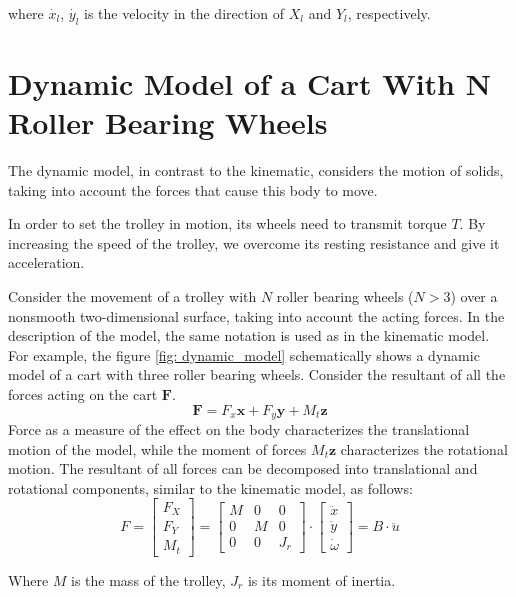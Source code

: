 \documentclass[oneside,final,14pt]{extreport}
\newcommand{\bs}{\boldsymbol}
\begin{document}
where $ \dot{x_{l}} $, $ \dot{y_{l}} $ is the velocity in the direction of $ X_{l} $ and $ Y_{l} $, respectively.
\fi

\chapter{Dynamic Model of a Cart With N Roller Bearing  Wheels}
The dynamic model, in contrast to the kinematic, considers the motion of solids, taking into account the forces that cause this body to move.
 
In order to set the trolley in motion, its wheels need to transmit torque $ T $. By increasing the speed of the trolley, we overcome its resting resistance and give it acceleration.
 
Consider the movement of a trolley with $ N $ roller bearing  wheels ($ N> 3 $) over a nonsmooth two-dimensional surface, taking into account the acting forces. In the description of the model, the same notation is used as in the kinematic model. For example, the figure \ref{fig: dynamic_model} schematically shows a dynamic model of a cart with three roller bearing  wheels. Consider the resultant of all the forces acting on the cart $ \bs{F} $.
\begin{equation}
\bs{F}
=
F_{x} \bs{x}
+
F_{y} \bs{y}
+
M_{t} \bs{z}
\end{equation}
Force as a measure of the effect on the body characterizes the translational motion of the model, while the moment of forces $ M_{t} \bs{z} $ characterizes the rotational motion. The resultant of all forces can be decomposed into translational and rotational components, similar to the kinematic model, as follows:
\begin{equation}
F
=
\begin{bmatrix}
F_{X} \\
F_{Y} \\
M_{t}
\end{bmatrix}
=
\begin{bmatrix}
M & 0 & 0 \\
0 & M & 0 \\
0 & 0 & J_{r}
\end{bmatrix}
\cdot
\begin{bmatrix}
\ddot{x} \\
\ddot{y} \\
\dot{\omega}
\end{bmatrix}
=
B \cdot \ddot{u}
\end{equation}

Where $ M $ is the mass of the trolley, $ J_{r} $ is its moment of inertia.
\end{document}
